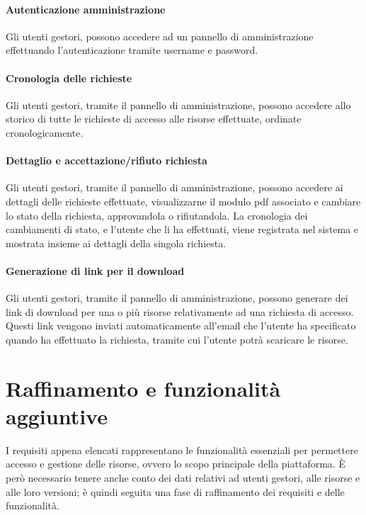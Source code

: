 \paragraph{Autenticazione amministrazione}
Gli utenti gestori, possono accedere ad un pannello di amministrazione
effettuando l'autenticazione tramite username e password.

\paragraph{Cronologia delle richieste}
Gli utenti gestori, tramite il pannello di amministrazione, possono accedere allo
storico di tutte le richieste di accesso alle risorse effettuate, ordinate
cronologicamente.

\paragraph{Dettaglio e accettazione/rifiuto richiesta}
Gli utenti gestori, tramite il pannello di amministrazione, possono accedere ai
dettagli delle richieste effettuate, visualizzarne il modulo pdf associato e
cambiare lo stato della richiesta, approvandola o rifiutandola.
La cronologia dei cambiamenti di stato, e l'utente che li ha effettuati, viene
registrata nel sistema e mostrata insieme ai dettagli della singola richiesta.

\paragraph{Generazione di link per il download}
Gli utenti gestori, tramite il pannello di amministrazione, possono generare dei
link di download per una o più risorse relativamente ad una richiesta di accesso.
Questi link vengono inviati automaticamente all'email che l'utente ha specificato
quando ha effettuato la richiesta, tramite cui l'utente potrà scaricare le risorse.



\section{Raffinamento e funzionalità aggiuntive}
I requisiti appena elencati rappresentano le funzionalità essenziali per permettere
accesso e gestione delle risorse, ovvero lo scopo principale della piattaforma.
È però necessario tenere anche conto dei dati relativi ad utenti gestori, alle
risorse e alle loro versioni; è quindi seguita una fase di raffinamento dei
requisiti e delle funzionalità.


